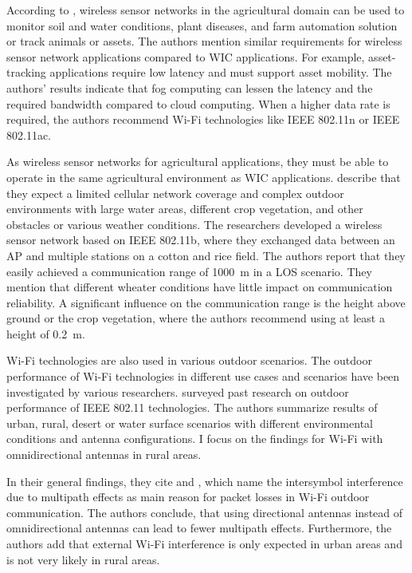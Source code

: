 According to \textcite{ahmed_internet_2018}, wireless sensor networks in the agricultural domain can be used to monitor soil and water conditions, plant diseases, and farm automation solution
or track animals or assets. The authors mention similar requirements for wireless sensor network applications compared to \ac{WIC} applications.
For example, asset-tracking applications require low latency and must support asset mobility.
The authors' results indicate that fog computing can lessen the latency and the required bandwidth compared to cloud computing.
When a higher data rate is required, the authors recommend Wi-Fi technologies like IEEE 802.11n or IEEE 802.11ac.

As wireless sensor networks for agricultural applications, they must be able to operate in the same agricultural environment as \ac{WIC} applications.
\textcite{brinkhoff_characterization_2017} describe that they expect a limited cellular network coverage and complex outdoor
environments with large water areas, different crop vegetation, and other obstacles or various weather conditions. The
researchers developed a wireless sensor network based on IEEE 802.11b, where they exchanged data between an \ac{AP} and multiple stations on
a cotton and rice field. The authors report that they easily achieved a communication range of \SI{1000}{\metre} in a \ac{LOS} scenario.
They mention that different wheater conditions have little impact on communication reliability. A significant influence on the communication range is the height above ground or the crop vegetation, where the authors recommend using at least a height of \SI{0.2}{\metre}.


Wi-Fi technologies are also used in various outdoor scenarios.
The outdoor performance of Wi-Fi technologies in different use cases and scenarios have been investigated by various researchers.
\textcite{aust_outdoor_2015} surveyed past research on outdoor performance of IEEE 802.11 technologies. The authors summarize results of
urban, rural, desert or water surface scenarios with different environmental conditions and antenna configurations. I focus on the
findings for Wi-Fi with omnidirectional antennas in rural areas.

In their general findings, they cite \cite{sheth_packet_2007} and \cite{aguayo_link-level_2004}, which name the intersymbol
interference due to multipath effects as main reason for packet losses in Wi-Fi outdoor communication. The authors conclude,
that using directional antennas instead of omnidirectional antennas can lead to fewer multipath effects. Furthermore, the authors add
that external Wi-Fi interference is only expected in urban areas and is not very likely in rural areas.

